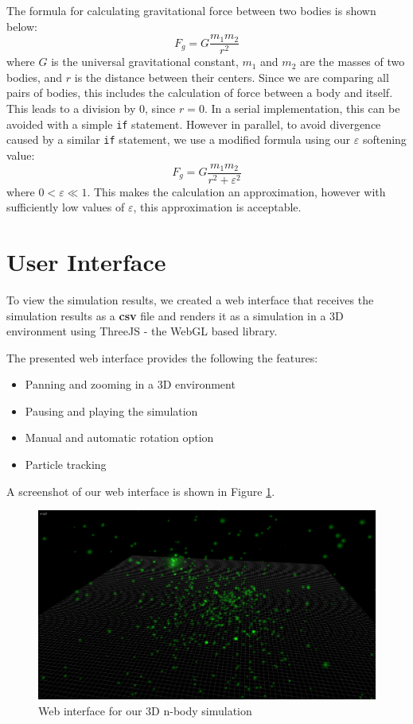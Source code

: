 \documentclass[11pt,a4paper]{article}
\begin{document}
	The formula for calculating gravitational force between two bodies is shown below:
	\begin{equation}
	F_g = G\frac{m_1 m_2}{r^2}
	\end{equation}
	where $G$ is the universal gravitational constant, $m_1$ and $m_2$ are the masses of two bodies, and $r$ is the distance between their centers. Since we are comparing all pairs of bodies, this includes the calculation of force between a body and itself. This leads to a division by 0, since $r = 0$. In a serial implementation, this can be avoided with a simple \texttt{if} statement. However in parallel, to avoid divergence caused by a similar \texttt{if} statement, we use a modified formula using our $\varepsilon$ softening value:
	\begin{equation}
	F_g = G\frac{m_1 m_2}{r^2 + \varepsilon^2}
	\end{equation}
	where $0 < \varepsilon \ll 1$. This makes the calculation an approximation, however with sufficiently low values of $\varepsilon$, this approximation is acceptable.
	
	\section{User Interface}
	To view the simulation results, we created a web interface that receives the simulation results as a \textbf{csv} file and renders it as a simulation in a 3D environment using ThreeJS - the WebGL based library.
	
	The presented web interface provides the following the features: 
	\begin{itemize}
		\item Panning and zooming in a 3D environment
		\item Pausing and playing the simulation 
		\item Manual and automatic rotation option
		\item Particle tracking
	\end{itemize}
	
	A screenshot of our web interface is shown in Figure \ref{scr}.
	\begin{figure}
		\centering
		\includegraphics[scale=0.3]{scr.png}
		\caption{Web interface for our 3D n-body simulation}
		\label{scr}
	\end{figure}
	
\end{document}

